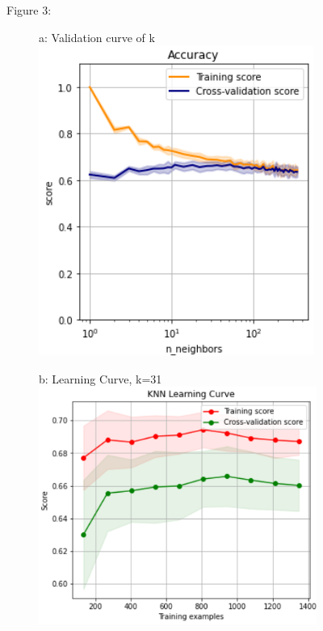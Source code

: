 \documentclass{article}
\begin{document}
\begin{figure}
	\centering
	Figure 3:\\
	\begin{subfigure}{.26\textwidth}
		\centering
		a: Validation curve of k
		\includegraphics[width=\linewidth]{poland_knn_n_neighbors_350_accuracy.png}
		
	\end{subfigure}
	\begin{subfigure}{.34\textwidth}
		\centering
		b: Learning Curve, k=31
		\includegraphics[width=\linewidth]{poland_knn_learning_curve.png}
		

\end{subfigure}
\end{figure}
\end{document}
